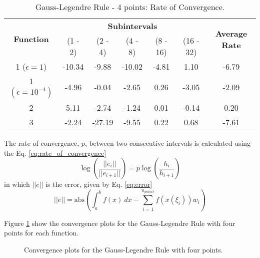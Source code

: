 \begin{table}[H]
    \centering
    \caption{Gauss-Legendre Rule - 4 points: Rate of Convergence.}
    \label{tab:gauss4_rate}
    \begin{tabular}{ccccccc}
        \hline
        \multirow{2}{*}{\textbf{Function}} & \multicolumn{5}{c}{\textbf{Subintervals}} & \multicolumn{1}{c}{\multirow{2}{*}{\textbf{Average Rate}}} \\ \cline{2-6}
 & (1 - 2) & (2 - 4) & (4 - 8) & (8 - 16) & (16 - 32) & \multicolumn{1}{c}{} \\ \hline
        \makecell{1 \\ ($\epsilon = 1$)} & -10.34 & -9.88 & -10.02 & -4.81 & 1.10 & -6.79 \\
        \makecell{1 \\ $\left(\epsilon = 10^{-4}\right)$} & -4.96 & -0.04 & -2.65 & 0.26 & -3.05 & -2.09 \\
        2 & 5.11 & -2.74 & -1.24 & 0.01 & -0.14 & 0.20 \\ 
        3 & -2.24 & -27.19 & -9.55 & 0.22 & 0.68 & -7.61 \\ \hline
    \end{tabular}
\end{table}

The rate of convergence, $p$, between two consecutive intervals is calculated using the Eq. \eqref{eq:rate_of_convergence}
\begin{equation}
    \label{eq:rate_of_convergence}
    \log{\left(\frac{||e_i||}{||e_{i+1}||}\right)} = p \log{\left(\frac{h_i}{h_{i+1}}\right)}
\end{equation}
in which $||e||$ is the error, given by Eq. \eqref{eq:error}
\begin{equation}
    \label{eq:error}
    ||e|| = \text{abs}\left( \int_{a}^{b} f(x)~dx - \sum_{i=1}^{n_{points}} f(x(\xi_i)) w_i \right)
\end{equation}

Figure \ref{fig:gauss4_convergence} show the convergence plots for the Gauss-Legendre Rule with four points for each function.

\begin{figure}[H]
    \centering
    \hfill
     \vskip 5mm
     \hfill
    \caption{Convergence plots for the Gauss-Legendre Rule with four points.}
    \label{fig:gauss4_convergence}
\end{figure}
